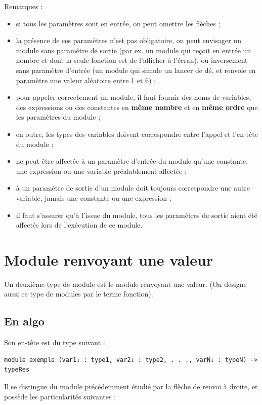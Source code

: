 \documentclass[11pt,a4paper]{article}
\begin{document}
            \par
        
        Remarques : 
        
					\begin{itemize}
				
			\item si tous les param\`etres sont en entr\'ee, on peut omettre les fl\`eches ;
			\item 
              la pr\'esence de ces param\`etres n'est pas obligatoire, on peut envisager un module sans
              param\`etre de sortie (par ex. un module qui re\c coit en entr\'ee un nombre et dont la seule
              fonction est de l'afficher \`a l'\'ecran), ou inversement sans param\`etre d'entr\'ee (un module
              qui simule un lancer de d\'e, et renvoie en param\`etre une valeur al\'eatoire entre 1 et 6) ;
            
			\item 
              pour appeler correctement un module, il faut fournir des noms de variables, des expressions ou des constantes 
              en \textbf{m\^eme nombre} et en \textbf{m\^eme ordre} 
              que les param\`etres du module ;
            
			\item en outre, les types des variables doivent correspondre entre l'appel et l'en-t\^ete du module ;
			\item ne peut \^etre affect\'ee \`a un param\`etre d'entr\'ee du module qu'une constante, une expression ou une variable pr\'ealablement affect\'ee ;
			\item \`a un param\`etre de sortie d'un module doit toujours correspondre une autre variable, jamais une constante ou une expression ;
			\item il faut s'assurer qu'\`a l'issue du module, tous les param\`etres de sortie aient \'et\'e affect\'es lors de l'ex\'ecution de ce module.
					\end{itemize}
				
            \par
        \section{Module renvoyant une valeur}Un deuxi\`eme type de module est le module renvoyant une valeur. 
    (On d\'esigne aussi ce type de modules par le terme fonction).\subsection{En algo}Son en-t\^ete est du type suivant :
            \par
        \begin{verbatim}
module exemple (var1↓ : type1, var2↓ : type2, . . ., varN↓ : typeN) -> typeRes
      \end{verbatim}
        Il se distingue du module pr\'ec\'edemment \'etudi\'e par la fl\`eche de renvoi \`a droite,
        et poss\`ede les particularit\'es suivantes :
      
\end{document}

